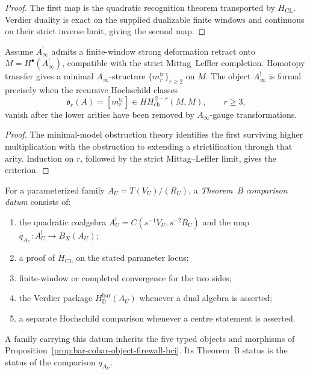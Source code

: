 \begin{proof}
The first map is the quadratic recognition theorem transported by
\(H_{\mathrm{CL}}\).  Verdier duality is exact on the supplied
dualizable finite windows and continuous on their strict inverse
limit, giving the second map.
\end{proof}

\begin{proposition}
\label{prop:verdier-koszul-formality-criterion-bci}
Assume \(A^!_\infty\) admits a finite-window strong deformation
retract onto
\(M=H^\bullet(A^!_\infty)\), compatible with the strict
Mittag--Leffler completion.  Homotopy transfer gives a minimal
\(A_\infty\)-structure
\(\{m_r^{\mathrm{tr}}\}_{r\geq2}\) on \(M\).  The object
\(A^!_\infty\) is formal precisely when the recursive Hochschild
classes
\[
\mathfrak o_r(A)=[m_r^{\mathrm{tr}}]
\in HH_{\mathrm{ch}}^{\,2-r}(M,M),
\qquad r\geq3,
\]
vanish after the lower arities have been removed by
\(A_\infty\)-gauge transformations.
\end{proposition}

\begin{proof}
The minimal-model obstruction theory identifies the first surviving
higher multiplication with the obstruction to extending a
strictification through that arity.  Induction on \(r\), followed by
the strict Mittag--Leffler limit, gives the criterion.
\end{proof}

\begin{proposition}
\label{prop:standard-family-firewall-table-bci}
For a parameterized family \(A_U=T(V_U)/(R_U)\), a
\emph{Theorem~B comparison datum} consists of:
\begin{enumerate}[label=\textup{(\alph*)}]
\item the quadratic coalgebra
\(A_U^{\mathrm i}=C(s^{-1}V_U,s^{-2}R_U)\) and the map
\(q_{A_U}\colon A_U^{\mathrm i}\to B_X(A_U)\);
\item a proof of \(H_{\mathrm{CL}}\) on the stated parameter locus;
\item finite-window or completed convergence for the two sides;
\item the Verdier package \(H_{\mathbb D}^{\mathrm{bar}}(A_U)\) whenever a dual
algebra is asserted;
\item a separate Hochschild comparison whenever a centre statement
is asserted.
\end{enumerate}
A family carrying this datum inherits the five typed objects and
morphisms of
Proposition~\ref{prop:bar-cobar-object-firewall-bci}.  Its Theorem~B
status is the status of the comparison \(q_{A_U}\).
\end{proposition}

